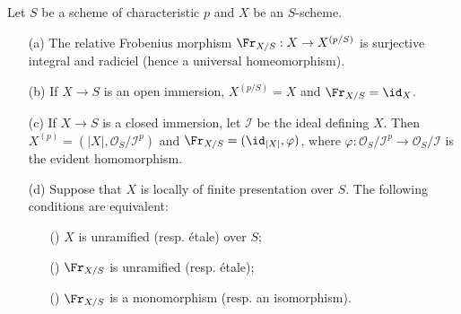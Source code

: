\begin{proposition}\label{scheme relative Frobenius morphism prop}
Let $S$ be a scheme of characteristic $p$ and $X$ be an $S$-scheme.
\begin{enumerate}
    \item[(a)] The relative Frobenius morphism $\Fr_{X/S}:X\to X^{(p/S)}$ is surjective integral and radiciel (hence a universal homeomorphism).
    \item[(b)] If $X\to S$ is an open immersion, $X^{(p/S)}=X$ and $\Fr_{X/S}=\id_X$. 
    \item[(c)] If $X\to S$ is a closed immersion, let $\mathscr{I}$ be the ideal defining $X$. Then $X^{(p)}=(|X|,\mathscr{O}_S/\mathscr{I}^p)$ and $\Fr_{X/S}=(\id_{|X|},\varphi)$, where $\varphi:\mathscr{O}_S/\mathscr{I}^p\to\mathscr{O}_S/\mathscr{I}$ is the evident homomorphism.
    \item[(d)] Suppose that $X$ is locally of finite presentation over $S$. The following conditions are equivalent:
    \begin{enumerate}
        \item[(\rmnum{1})] $X$ is unramified (resp. \'etale) over $S$;
        \item[(\rmnum{2})] $\Fr_{X/S}$ is unramified (resp. \'etale);
        \item[(\rmnum{3})] $\Fr_{X/S}$ is a monomorphism (resp. an isomorphism).  
    \end{enumerate}
\end{enumerate}
\end{proposition}
